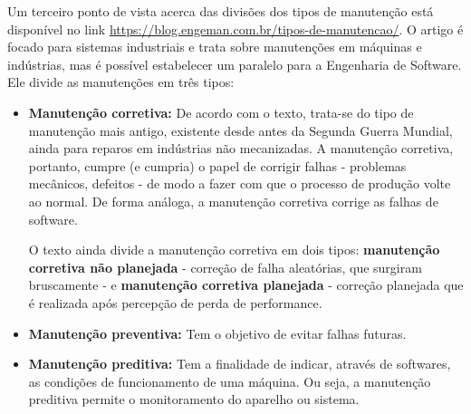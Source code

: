 \newline
\par Um terceiro ponto de vista acerca das divisões dos tipos de manutenção está disponível no link \url{https://blog.engeman.com.br/tipos-de-manutencao/}. O artigo é focado para sistemas industriais e trata sobre manutenções em máquinas e indústrias, mas é possível estabelecer um paralelo para a Engenharia de Software. Ele divide as manutenções em três tipos:
\begin{itemize}
    \item \textbf{Manutenção corretiva:} De acordo com o texto, trata-se do tipo de manutenção mais antigo, existente desde antes da Segunda Guerra Mundial, ainda para reparos em indústrias não mecanizadas. A manutenção corretiva, portanto, cumpre (e cumpria) o papel de corrigir falhas - problemas mecânicos, defeitos - de modo a fazer com que o processo de produção volte ao normal. De forma análoga, a manutenção corretiva corrige as falhas de software.
    \newline
    \par O texto ainda divide a manutenção corretiva em dois tipos: \textbf{manutenção corretiva não planejada} - correção de falha aleatórias, que surgiram bruscamente - e \textbf{manutenção corretiva planejada} - correção planejada que é realizada após percepção de perda de performance.

    \item \textbf{Manutenção preventiva:} Tem o objetivo de evitar falhas futuras.
    \item \textbf{Manutenção preditiva:} Tem a finalidade de indicar, através de softwares, as condições de funcionamento de uma máquina. Ou seja, a manutenção preditiva permite o monitoramento do aparelho ou sistema.
\end{itemize}
